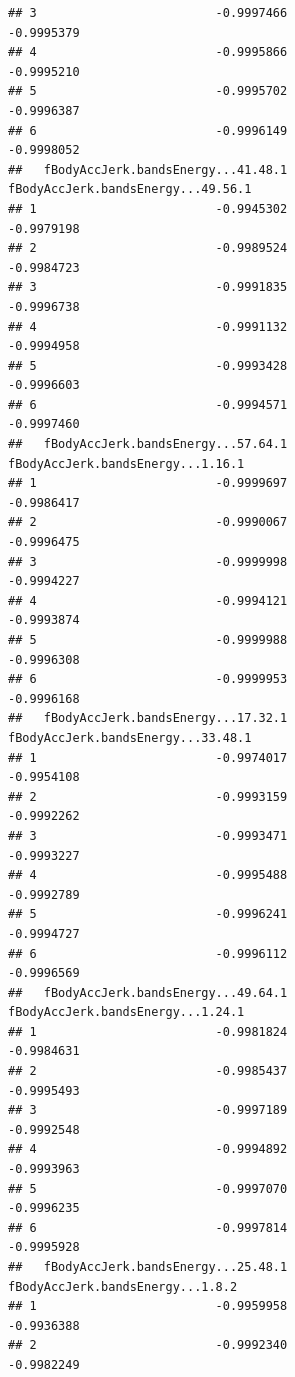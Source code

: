 \documentclass[
]{article}
\begin{document}
\begin{verbatim}
## 3                         -0.9997466                         -0.9995379
## 4                         -0.9995866                         -0.9995210
## 5                         -0.9995702                         -0.9996387
## 6                         -0.9996149                         -0.9998052
##   fBodyAccJerk.bandsEnergy...41.48.1 fBodyAccJerk.bandsEnergy...49.56.1
## 1                         -0.9945302                         -0.9979198
## 2                         -0.9989524                         -0.9984723
## 3                         -0.9991835                         -0.9996738
## 4                         -0.9991132                         -0.9994958
## 5                         -0.9993428                         -0.9996603
## 6                         -0.9994571                         -0.9997460
##   fBodyAccJerk.bandsEnergy...57.64.1 fBodyAccJerk.bandsEnergy...1.16.1
## 1                         -0.9999697                        -0.9986417
## 2                         -0.9990067                        -0.9996475
## 3                         -0.9999998                        -0.9994227
## 4                         -0.9994121                        -0.9993874
## 5                         -0.9999988                        -0.9996308
## 6                         -0.9999953                        -0.9996168
##   fBodyAccJerk.bandsEnergy...17.32.1 fBodyAccJerk.bandsEnergy...33.48.1
## 1                         -0.9974017                         -0.9954108
## 2                         -0.9993159                         -0.9992262
## 3                         -0.9993471                         -0.9993227
## 4                         -0.9995488                         -0.9992789
## 5                         -0.9996241                         -0.9994727
## 6                         -0.9996112                         -0.9996569
##   fBodyAccJerk.bandsEnergy...49.64.1 fBodyAccJerk.bandsEnergy...1.24.1
## 1                         -0.9981824                        -0.9984631
## 2                         -0.9985437                        -0.9995493
## 3                         -0.9997189                        -0.9992548
## 4                         -0.9994892                        -0.9993963
## 5                         -0.9997070                        -0.9996235
## 6                         -0.9997814                        -0.9995928
##   fBodyAccJerk.bandsEnergy...25.48.1 fBodyAccJerk.bandsEnergy...1.8.2
## 1                         -0.9959958                       -0.9936388
## 2                         -0.9992340                       -0.9982249

\end{verbatim}
\end{document}

